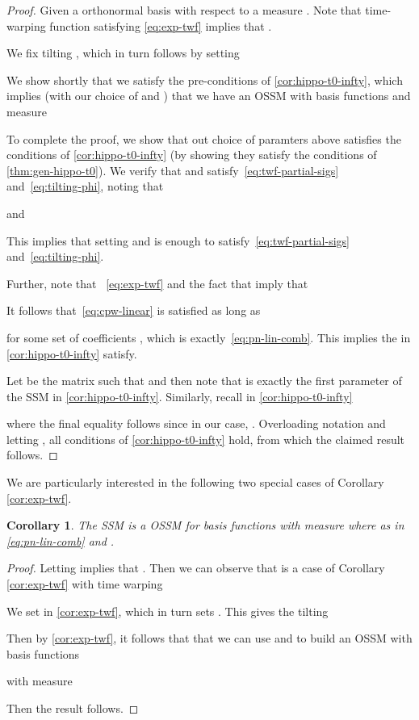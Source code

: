 \documentclass{article}
\newtheorem{corollary}[lemma]{Corollary}
\begin{document}
\begin{proof}
 Given a orthonormal basis  with respect to a measure . Note that time-warping function  satisfying \eqref{eq:exp-twf} implies that .

 We fix tilting  , which in turn follows by setting
 
 We show shortly that we satisfy the pre-conditions of \cref{cor:hippo-t0-infty}, which implies (with our choice of  and ) that we have an OSSM with basis functions   and measure





To complete the proof, we show that out choice of paramters above satisfies the conditions of  \cref{cor:hippo-t0-infty} (by showing they satisfy the conditions of \cref{thm:gen-hippo-t0}). We verify that  and  satisfy~\eqref{eq:twf-partial-sigs} and~\eqref{eq:tilting-phi}, noting that


and

 This implies that setting  and  is enough to satisfy~\eqref{eq:twf-partial-sigs} and~\eqref{eq:tilting-phi}.

 Further, note that ~\eqref{eq:exp-twf} and the fact that  imply that



It follows that~\eqref{eq:cpw-linear} is satisfied as long as



for some set of coefficients , which is exactly~\eqref{eq:pn-lin-comb}. This implies the  in \cref{cor:hippo-t0-infty} satisfy.

Let  be the matrix such that  and then note that  is exactly the first parameter of the SSM in \cref{cor:hippo-t0-infty}.  Similarly, recall in \cref{cor:hippo-t0-infty}



where the final equality follows since in our case, . Overloading notation and letting , all conditions of \cref{cor:hippo-t0-infty} hold, from which the claimed result follows.
\end{proof}

We are particularly interested in the following two special cases of Corollary \ref{cor:exp-twf}.



\begin{corollary}The SSM  is a OSSM for basis functions  with measure  where
    as in \eqref{eq:pn-lin-comb} and .
 \label{cor:scale_inv_hippo_legs}
\end{corollary}
\begin{proof}
Letting  implies that . Then we can observe that is a case of Corollary \ref{cor:exp-twf} with time warping



We set  in \cref{cor:exp-twf}, which in turn sets . This gives the tilting



Then by \cref{cor:exp-twf}, it follows that that we can use  and  to build an OSSM with basis functions


with measure



Then the result follows.
\end{proof}
\end{document}
